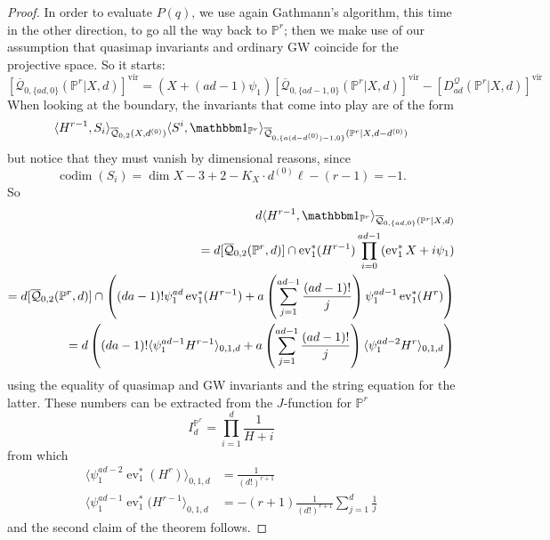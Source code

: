 \documentclass[11pt]{amsart}
\newcommand{\Q}[4]{\overline{\mathcal Q}_{#1,#2}(#3,#4)}
\newcommand{\PP}{\mathbb P}
\newcommand{\ev}{\operatorname{ev}}
\newcommand{\codim}{\operatorname{codim}}
\theoremstyle{plain}
\theoremstyle{definition}
\begin{document}
\begin{proof}
In order to evaluate $P(q)$, we use again Gathmann's algorithm, this time in the other direction, to go all the way back to $\PP^r$; then we make use of our assumption that quasimap invariants and ordinary GW coincide for the projective space. So it starts:
\[
 [\Q{0}{\{ad,0\}}{\PP^r|X}{d}]^\text{vir}=(X+(ad-1)\psi_1)[\Q{0}{\{ad-1,0\}}{\PP^r|X}{d}]^\text{vir}-[D_{ad}^{\mathcal Q}(\PP^r|X,d)]^\text{vir}
\]
When looking at the boundary, the invariants that come into play are of the form
\[
 \langle H^{r-1},S_i\rangle_{\Q{0}{2}{X}{d^{(0)}}}\langle S^i,\mathbbm 1_{\PP^r}\rangle_{\Q{0}{\{a(d-d^{(0)})-1,0\}}{\PP^r|X}{d-d^{(0)}}}
\]
but notice that they must vanish by dimensional reasons, since
\[
 \codim(S_i)=\dim X-3+2-K_X\cdot d^{(0)}\ell-(r-1)=-1.
\]
So
\begin{align*}
 d\langle H^{r-1},\mathbbm 1_{\PP^r}\rangle_{\Q{0}{\{ad,0\}}{\PP^r|X}{d}} \\
 = d[\Q{0}{2}{\PP^r}{d}]\cap\ev_1^*(H^{r-1})\prod_{i=0}^{ad-1}(\ev_1^*X+i\psi_1) \\
 = d[\Q{0}{2}{\PP^r}{d}]\cap\left((da-1)!\psi_1^{ad}\ev_1^*(H^{r-1})+a\left(\sum_{j=1}^{ad-1}\frac{(ad-1)!}{j}\right)\psi_1^{ad-1}\ev_1^*(H^{r})\right) \\
 = d\left((da-1)!\langle \psi_1^{ad-1}H^{r-1}\rangle_{0,1,d}+a\left(\sum_{j=1}^{ad-1}\frac{(ad-1)!}{j}\right)\langle\psi_1^{ad-2}H^{r}\rangle_{0,1,d}\right)
\end{align*}
using the equality of quasimap and GW invariants and the string equation for the latter. These numbers can be extracted from the $J$-function for $\PP^r$
\[
 I^{\PP^r}_d=\prod_{i=1}^d\frac{1}{H+i}
\]
from which
\begin{align*}
 \langle \psi_1^{ad-2}\ev_1^*(H^{r})\rangle_{0,1,d} &=\frac{1}{(d!)^{r+1}} \\
 \langle \psi_1^{ad-1}\ev_1^*(H^{r-1}\rangle_{0,1,d} &=-(r+1)\frac{1}{(d!)^{r+1}}\sum_{j=1}^d\frac{1}{j}
\end{align*}
and the second claim of the theorem follows.
\end{proof}



\end{document}
